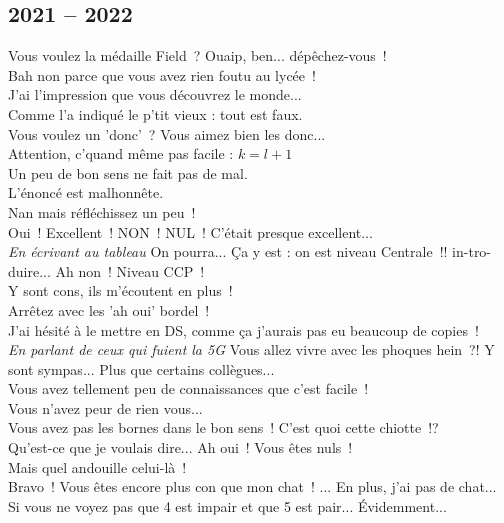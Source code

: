 \documentclass[french, a4paper, openany]{book}
\begin{document}
	\subsection*{2021 -- 2022}
		\noindent \og Vous voulez la médaille Field~? Ouaip, ben... dépêchez-vous~! \fg \\
		\og Bah non parce que vous avez rien foutu au lycée~! \fg \\
		\og J'ai l'impression que vous découvrez le monde... \fg \\
		\og Comme l'a indiqué le p'tit vieux : tout est faux. \fg \\
		\og Vous voulez un 'donc'~? Vous aimez bien les donc... \fg \\
		\og Attention, c'quand même pas facile : $k = l+ 1$ \fg \\
		\og Un peu de bon sens ne fait pas de mal. \fg \\
		\og L'énoncé est malhonnête. \fg \\
		\og Nan mais réfléchissez un peu~! \fg \\
		\og Oui~! Excellent~! NON~! NUL~! C'était presque excellent... \fg \\
		\emph{En écrivant au tableau} \og On pourra... Ça y est : on est niveau Centrale~!! in-tro-duire... Ah non~! Niveau CCP~! \fg \\
		\og Y sont cons, ils m'écoutent en plus~! \fg \\
		\og Arrêtez avec les 'ah oui' bordel~! \fg \\
		\og J'ai hésité à le mettre en DS, comme ça j'aurais pas eu beaucoup de copies~! \fg \\
		\emph{En parlant de ceux qui fuient la 5G} \og Vous allez vivre avec les phoques hein~?! Y sont sympas... Plus que certains collègues... \fg \\
		\og Vous avez tellement peu de connaissances que c'est facile~! \fg \\
		\og Vous n'avez peur de rien vous... \fg \\	
		\og Vous avez pas les bornes dans le bon sens~! C'est quoi cette chiotte~!? \fg \\
		\og Qu'est-ce que je voulais dire... Ah oui~! Vous êtes nuls~! \fg \\
		\og Mais quel andouille celui-là~! \fg \\
		\og Bravo~! Vous êtes encore plus con que mon chat~! ... En plus, j'ai pas de chat... \fg \\
		\og Si vous ne voyez pas que 4 est impair et que 5 est pair... Évidemment... \fg \\
\end{document}
